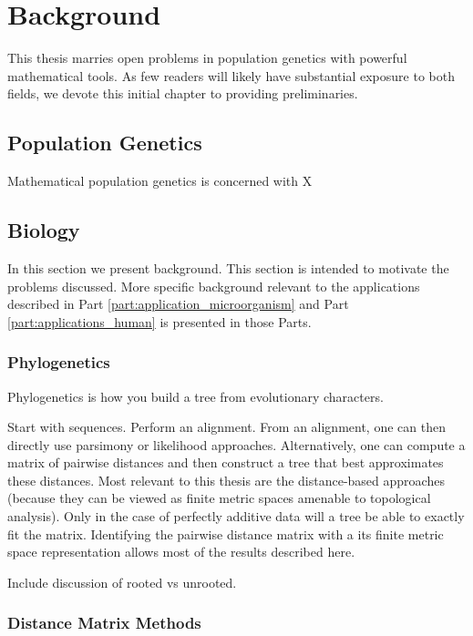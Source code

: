 
\chapter{Background}
\label{ch:background}

This thesis marries open problems in population genetics with powerful mathematical tools.
As few readers will likely have substantial exposure to both fields, we devote this initial chapter to providing preliminaries.

\section{Population Genetics}

Mathematical population genetics is concerned with X

\section{Biology}

In this section we present background.
This section is intended to motivate the problems discussed.
More specific background relevant to the applications described in Part \ref{part:application_microorganism} and Part \ref{part:applications_human} is presented in those Parts.

\subsection{Phylogenetics}

Phylogenetics is how you build a tree from evolutionary characters.

Start with sequences.
Perform an alignment.
From an alignment, one can then directly use parsimony or likelihood approaches.
Alternatively, one can compute a matrix of pairwise distances and then construct a tree that best approximates these distances.
Most relevant to this thesis are the distance-based approaches (because they can be viewed as finite metric spaces amenable to topological analysis).
Only in the case of perfectly additive data will a tree be able to exactly fit the matrix.
Identifying the pairwise distance matrix with a its finite metric space representation allows most of the results described here.

Include discussion of rooted vs unrooted.

\subsection{Distance Matrix Methods}

